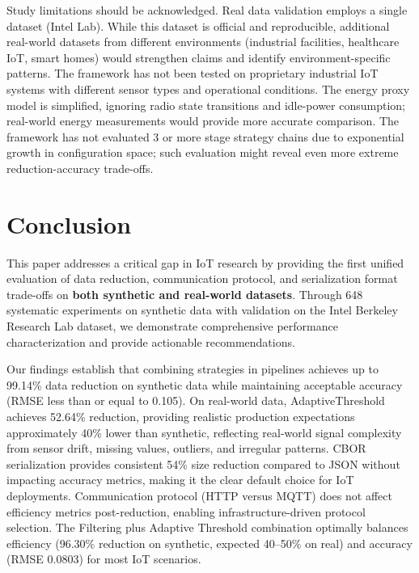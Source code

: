\documentclass[10pt,twocolumn]{article}
\begin{document}
Study limitations should be acknowledged. Real data validation employs a single dataset (Intel Lab). While this dataset is official and reproducible, additional real-world datasets from different environments (industrial facilities, healthcare IoT, smart homes) would strengthen claims and identify environment-specific patterns. The framework has not been tested on proprietary industrial IoT systems with different sensor types and operational conditions. The energy proxy model is simplified, ignoring radio state transitions and idle-power consumption; real-world energy measurements would provide more accurate comparison. The framework has not evaluated 3 or more stage strategy chains due to exponential growth in configuration space; such evaluation might reveal even more extreme reduction-accuracy trade-offs.

\section{Conclusion}

This paper addresses a critical gap in IoT research by providing the first unified evaluation of data reduction, communication protocol, and serialization format trade-offs on \textbf{both synthetic and real-world datasets}. Through 648 systematic experiments on synthetic data with validation on the Intel Berkeley Research Lab dataset, we demonstrate comprehensive performance characterization and provide actionable recommendations.

Our findings establish that combining strategies in pipelines achieves up to 99.14\% data reduction on synthetic data while maintaining acceptable accuracy (RMSE less than or equal to 0.105). On real-world data, AdaptiveThreshold achieves 52.64\% reduction, providing realistic production expectations approximately 40\% lower than synthetic, reflecting real-world signal complexity from sensor drift, missing values, outliers, and irregular patterns. CBOR serialization provides consistent 54\% size reduction compared to JSON without impacting accuracy metrics, making it the clear default choice for IoT deployments. Communication protocol (HTTP versus MQTT) does not affect efficiency metrics post-reduction, enabling infrastructure-driven protocol selection. The Filtering plus Adaptive Threshold combination optimally balances efficiency (96.30\% reduction on synthetic, expected 40--50\% on real) and accuracy (RMSE 0.0803) for most IoT scenarios.
\end{document}
